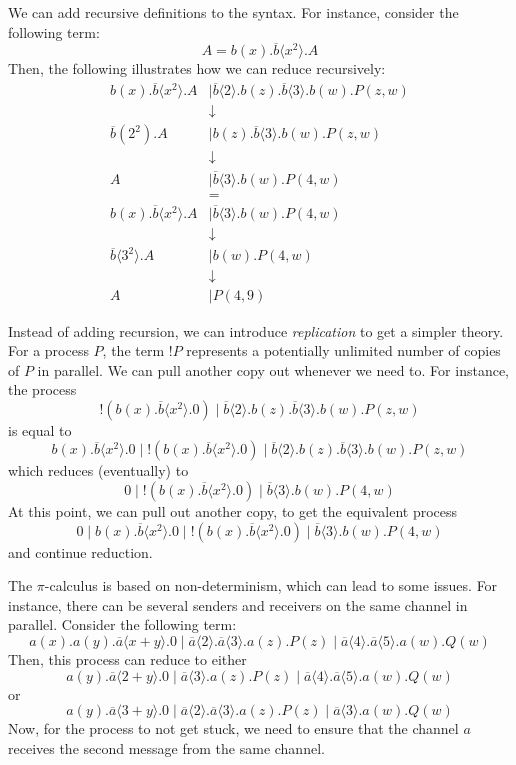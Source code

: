 \documentclass[a4paper, openany]{memoir}
\theoremstyle{definition}
\begin{document}
    We can add recursive definitions to the syntax. For instance, consider the following term:
    \[A = b(x).\overline{b}\langle x^2 \rangle.A\]
    Then, the following illustrates how we can reduce recursively:
    \begin{align*}
        b(x).\overline{b} \langle x^2 \rangle.A &\mid \overline{b} \langle 2 \rangle.b(z).\overline{b} \langle 3 \rangle.b(w).P(z, w) \\
        &\downarrow \\
        \overline{b}(2^2).A &\mid b(z).\overline{b} \langle 3 \rangle.b(w).P(z, w) \\
        &\downarrow \\
        A &\mid \overline{b} \langle 3 \rangle.b(w).P(4, w) \\
        &= \\
        b(x).\overline{b} \langle x^2 \rangle.A &\mid \overline{b} \langle 3 \rangle.b(w).P(4, w) \\
        &\downarrow \\ 
        \overline{b} \langle 3^2 \rangle.A &\mid b(w).P(4, w) \\
        &\downarrow \\
        A &\mid P(4, 9)
    \end{align*}
    
    Instead of adding recursion, we can introduce \emph{replication} to get a simpler theory. For a process $P$, the term $!P$ represents a potentially unlimited number of copies of $P$ in parallel. We can pull another copy out whenever we need to. For instance, the process
    \[!(b(x).\overline{b} \langle x^2 \rangle.0) \mid \overline{b} \langle 2 \rangle.b(z).\overline{b} \langle 3 \rangle.b(w).P(z, w)\]
    is equal to
    \[b(x).\overline{b} \langle x^2 \rangle.0 \mid !(b(x).\overline{b} \langle x^2 \rangle.0) \mid \overline{b} \langle 2 \rangle.b(z).\overline{b} \langle 3 \rangle.b(w).P(z, w)\]
    which reduces (eventually) to 
    \[0 \mid !(b(x).\overline{b} \langle x^2 \rangle.0) \mid \overline{b} \langle 3 \rangle.b(w).P(4, w)\]
    At this point, we can pull out another copy, to get the equivalent process
    \[0 \mid b(x).\overline{b} \langle x^2 \rangle.0 \mid !(b(x).\overline{b} \langle x^2 \rangle.0) \mid \overline{b} \langle 3 \rangle.b(w).P(4, w)\]
    and continue reduction.

    The $\pi$-calculus is based on non-determinism, which can lead to some issues. For instance, there can be several senders and receivers on the same channel in parallel. Consider the following term:
    \[a(x).a(y).\overline{a}\langle x + y \rangle.0 \mid \overline{a} \langle 2 \rangle.\overline{a} \langle 3 \rangle.a(z).P(z) \mid \overline{a} \langle 4 \rangle.\overline{a} \langle 5 \rangle.a(w).Q(w)\]
    Then, this process can reduce to either 
    \[a(y).\overline{a}\langle 2 + y \rangle.0 \mid \overline{a} \langle 3 \rangle.a(z).P(z) \mid \overline{a} \langle 4 \rangle.\overline{a} \langle 5 \rangle.a(w).Q(w)\]
    or 
    \[a(y).\overline{a}\langle 3 + y \rangle.0 \mid \overline{a} \langle 2 \rangle.\overline{a} \langle 3 \rangle.a(z).P(z) \mid \overline{a} \langle 3 \rangle.a(w).Q(w)\]
    Now, for the process to not get stuck, we need to ensure that the channel $a$ receives the second message from the same channel.
\end{document}
